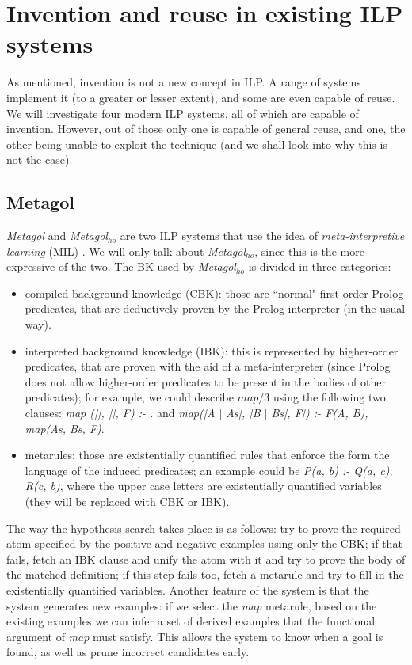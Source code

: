 \documentclass{article}
\theoremstyle{definition}
\begin{document}
\section{Invention and reuse in existing ILP systems}
As mentioned, invention is not a new concept in ILP. A range of systems implement it (to a greater or lesser extent), and some are even capable of reuse. We will investigate four modern ILP systems, all of which are capable of invention. However, out of those only one is capable of general reuse, and one, the other being unable to exploit the technique (and we shall look into why this is not the case). 

\subsection{Metagol}
\emph{Metagol} and \emph{Metagol$_{ho}$} \cite{metagolho} are two ILP systems that use the idea of \emph{meta-interpretive learning} (MIL) \cite{invabs2016}. We will only talk about \emph{Metagol$_{ho}$}, since this is the more expressive of the two. The BK used by \emph{Metagol$_{ho}$} is divided in three categories:
\begin{itemize}
\item compiled background knowledge (CBK): those are ``normal" first order Prolog predicates, that are deductively proven by the Prolog interpreter (in the usual way).
\item interpreted background knowledge (IBK): this is represented by higher-order predicates, that are proven with the aid of a meta-interpreter (since Prolog does not allow higher-order predicates to be present in the bodies of other predicates); for example, we could describe $map/3$ using the following two clauses:
\textit{map ([], [], F) :- .} and \textit{map([A $\mid$ As], [B $\mid$ Bs], F]) :- F(A, B), map(As, Bs, F)}.
\item metarules: those are existentially quantified rules that enforce the form the language of the induced predicates; an example could be \textit{P(a, b) :- Q(a, c), R(c, b)}, where the upper case letters are existentially quantified variables (they will be replaced with CBK or IBK).
\end{itemize}
The way the hypothesis search takes place is as follows: try to prove the required atom specified by the positive and negative examples using only the CBK; if that fails, fetch an IBK clause and unify the atom with it and try to prove the body of the matched definition; if this step fails too, fetch a metarule and try to fill in the existentially quantified variables. Another feature of the system is that the system generates new examples: if we select the \textit{map} metarule, based on the existing examples we can infer a set of derived examples that the functional argument of \textit{map} must satisfy. This allows the system to know when a goal is found, as well as prune incorrect candidates early.
\end{document}
